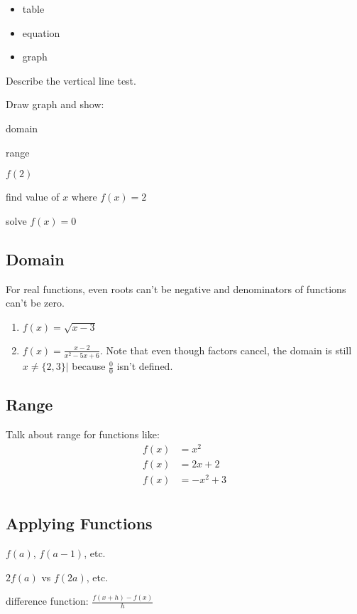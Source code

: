 \documentclass[letterpaper, landscape]{exam}
\begin{document}
  \begin{itemize}
    \item table
    \item equation
    \item graph
  \end{itemize}

  \begin{itemize*}
    \item Describe the vertical line test.
    \item Draw graph and show:
      \begin{itemize*}
        \item domain
        \item range
        \item $f(2)$
        \item find value of $x$ where $f(x) = 2$
        \item solve $f(x) = 0$
      \end{itemize*}
  \end{itemize*}

  \subsection{Domain}
  For real functions, even roots can't be negative and denominators of functions
  can't be zero.

  \begin{enumerate}
    \item $f(x) = \sqrt{x - 3}$ 
    \item $f(x) = \frac{x - 2}{x^2 - 5x + 6}$. Note that even though factors
      cancel, the domain is still $x \neq \{2, 3\}|$ because $\frac{0}{0}$ isn't
      defined.
  \end{enumerate}

  \subsection{Range}
  Talk about range for functions like:
  \begin{align*}
    f(x) &= x^2 \\
    f(x) &= 2x + 2 \\
    f(x) &= -x^2 + 3 \\
  \end{align*}

  \subsection{Applying Functions}
  \begin{itemize*}
    \item $f(a)$, $f(a - 1)$, etc.
    \item $2 f(a)$ vs $f(2a)$, etc.
    \item difference function: $\frac{f(x + h) - f(x)}{h}$
  \end{itemize*}
\end{document}
